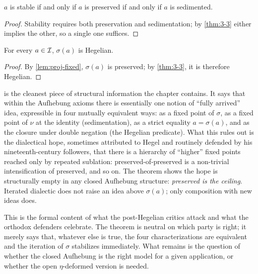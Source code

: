 \begin{corollary}[Stable = Preserved = Sedimented]\label{cor:stable-equiv}
$a$ is stable if and only if $a$ is preserved if and only if $a$ is
sedimented.
\end{corollary}

\begin{proof}
Stability requires both preservation and sedimentation; by
\cref{thm:3-3} either implies the other, so a single one suffices.
\end{proof}

\begin{corollary}\label{cor:sigma-heg}
For every $a\in\mathcal{I}$, $\sigma(a)$ is Hegelian.
\end{corollary}

\begin{proof}
By \cref{lem:proj-fixed}, $\sigma(a)$ is preserved; by
\cref{thm:3-3}, it is therefore Hegelian.
\end{proof}

 is the cleanest piece of structural information the
chapter contains. It says that within the Aufhebung axioms there is
essentially one notion of ``fully arrived'' idea, expressible in
four mutually equivalent ways: as a fixed point of $\sigma$, as a
fixed point of $\nu$ at the identity (sedimentation), as a strict
equality $a=\sigma(a)$, and as the closure under double negation
(the Hegelian predicate). What this rules out is the dialectical
hope, sometimes attributed to Hegel and routinely defended by his
nineteenth-century followers, that there is a hierarchy of
``higher'' fixed points reached only by repeated sublation:
preserved-of-preserved is a non-trivial intensification of
preserved, and so on. The theorem shows the hope is structurally
empty in any closed Aufhebung structure: \emph{preserved is the
ceiling}. Iterated dialectic does not raise an idea above
$\sigma(a)$; only composition with new ideas does.

This is the formal content of what the post-Hegelian critics
\citep{Adorno1966,Derrida1967} attack and what the orthodox
defenders \citep[in his more conservative passages]{Hegel1812}
celebrate. The theorem is neutral on which party is right; it merely
says that, whatever else is true, the four characterizations are
equivalent and the iteration of $\sigma$ stabilizes immediately.
What remains is the question of whether the closed Aufhebung is
the right model for a given application, or whether the open
$\eta$-deformed version is needed.

